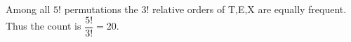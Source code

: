 Among all $5!$ permutations the $3!$ relative orders of T,E,X are equally frequent. Thus the count is $\dfrac{5!}{3!}=\boxed{20}$.
